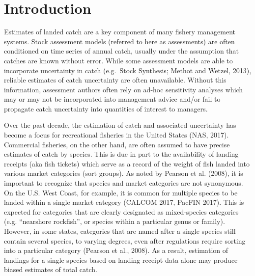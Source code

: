 \documentclass[12pt]{article}
\begin{document}
%
\clearpage
\onehalfspacing
%

\section{Introduction}\label{introduction}

Estimates of landed catch are a key component of many fishery management
systems. Stock assessment models (referred to here as assessments) are
often conditioned on time series of annual catch, usually under the
assumption that catches are known without error. While some assessment
models are able to incorporate uncertainty in catch (e.g.~Stock
Synthesis; Methot and Wetzel, 2013), reliable estimates of catch
uncertainty are often unavailable. Without this information, assessment
authors often rely on ad-hoc sensitivity analyses which may or may not
be incorporated into management advice and/or fail to propagate catch
uncertainty into quantities of interest to managers.

Over the past decade, the estimation of catch and associated uncertainty
has become a focus for recreational fisheries in the United States (NAS,
2017). Commercial fisheries, on the other hand, are often assumed to
have precise estimates of catch by species. This is due in part to the
availability of landing receipts (aka fish tickets) which serve as a
record of the weight of fish landed into various market categories (sort
groups). As noted by Pearson et al. (2008), it is important to recognize
that species and market categories are not synonymous. On the U.S. West
Coast, for example, it is common for multiple species to be landed
within a single market category (CALCOM 2017, PacFIN 2017). This is
expected for categories that are clearly designated as mixed-species
categories (e.g. ``nearshore rockfish'', or species within a particular
genus or family). However, in some states, categories that are named
after a single species still contain several species, to varying
degrees, even after regulations require sorting into a particular
category (Pearson et al., 2008). As a result, estimation of landings for
a single species based on landing receipt data alone may produce biased
estimates of total catch.
\end{document}
